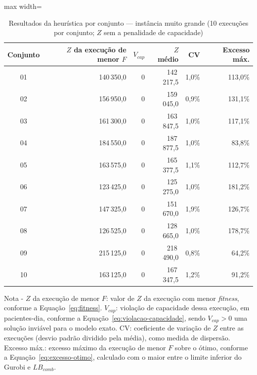 \begin{table}[htbp]
    \caption[Resultados da heurística por conjunto --- instância muito grande]{Resultados da heurística por conjunto --- instância muito grande (10 execuções por conjunto; $Z$ sem a penalidade de capacidade)}
    \label{tab:res-z-muito-grande}
    \centering
    \begin{adjustbox}{max width=\textwidth}
    \begin{tabular}{crrrrr}
        \hline
        \textbf{Conjunto} & \textbf{$Z$ da execução de menor $F$} & \textbf{$V_{cap}$} & \textbf{$Z$ médio} & \textbf{CV} & \textbf{Excesso máx.} \\
        \hline
        01 & 140\,350,0 & 0 & 142\,217,5 & 1,0\% & 113,0\% \\
        02 & 156\,950,0 & 0 & 159\,045,0 & 0,9\% & 131,1\% \\
        03 & 161\,300,0 & 0 & 163\,847,5 & 1,0\% & 117,1\% \\
        04 & 184\,550,0 & 0 & 187\,877,5 & 1,0\% & 83,8\% \\
        05 & 163\,575,0 & 0 & 165\,377,5 & 1,1\% & 112,7\% \\
        06 & 123\,425,0 & 0 & 125\,275,0 & 1,0\% & 181,2\% \\
        07 & 147\,325,0 & 0 & 151\,670,0 & 1,9\% & 126,7\% \\
        08 & 126\,525,0 & 0 & 128\,665,0 & 1,0\% & 178,7\% \\
        09 & 215\,125,0 & 0 & 218\,490,0 & 0,8\% & 64,2\% \\
        10 & 163\,125,0 & 0 & 167\,347,5 & 1,2\% & 91,2\% \\
        \hline
    \end{tabular}
    \end{adjustbox}
    \par\smallskip
    {\footnotesize Nota - $Z$ da execução de menor $F$: valor de $Z$ da execução com menor \textit{fitness}, conforme a Equação~\eqref{eq:fitness}. $V_{cap}$: violação de capacidade dessa execução, em pacientes-dia, conforme a Equação~\eqref{eq:violacao-capacidade}, sendo $V_{cap} > 0$ uma solução inviável para o modelo exato. CV: coeficiente de variação de $Z$ entre as execuções (desvio padrão dividido pela média), como medida de dispersão. Excesso máx.: excesso máximo da execução de menor $F$ sobre o ótimo, conforme a Equação~\eqref{eq:excesso-otimo}, calculado com o maior entre o limite inferior do Gurobi e $LB_{comb}$.}
\end{table}
